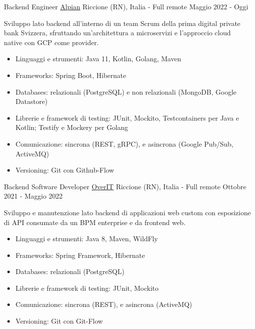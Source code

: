 

\begin{cventries}
	
\cventry
{Backend Engineer} %
{\href{https://alpian.com/it}{Alpian}} %
{Riccione (RN), Italia - Full remote} %
{Maggio 2022 - Oggi} %
{
	Sviluppo lato backend all'interno di un team Scrum della prima digital private bank Svizzera, sfruttando un'architettura a microservizi e l'approccio cloud native con GCP come provider.
	\begin{itemize}
		\item {Linguaggi e strumenti: Java 11, Kotlin, Golang, Maven}
		\item {Frameworks: Spring Boot, Hibernate}
		\item {Databases: relazionali (PostgreSQL) e non relazionali (MongoDB, Google Datastore)}
		\item {Librerie e framework di testing: JUnit, Mockito, Testcontainers per Java e Kotlin; Testify e Mockery per Golang}
		\item {Comunicazione: sincrona (REST, gRPC), e asincrona (Google Pub/Sub, ActiveMQ)}
		\item {Versioning: Git con Github-Flow}
	\end{itemize}
}


\cventry
	{Backend Software Developer} %
	{\href{https://overit.it}{OverIT}} %
	{Riccione (RN), Italia - Full remote} %
	{Ottobre 2021 - Maggio 2022} %
	{
		Sviluppo e manutenzione lato backend di applicazioni web custom con esposizione di API consumate da un BPM enterprise e da frontend web.
		\begin{itemize}
			\item {Linguaggi e strumenti: Java 8, Maven, WildFly}
			\item {Frameworks: Spring Framework, Hibernate}
			\item {Databases: relazionali (PostgreSQL)}
			\item {Librerie e framework di testing: JUnit, Mockito}
			\item {Comunicazione: sincrona (REST), e asincrona (ActiveMQ)}
			\item {Versioning: Git con Git-Flow}
		\end{itemize}
	}


\end{cventries}
